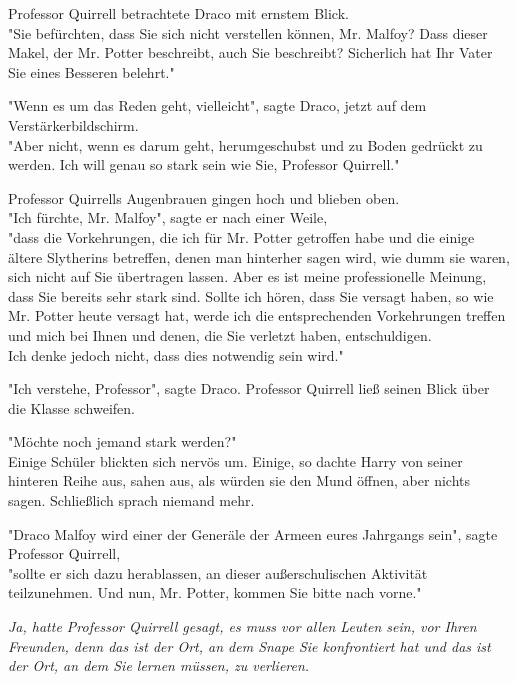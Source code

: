 {Professor Quirrell betrachtete Draco mit ernstem Blick.\\ "Sie befürchten, dass Sie sich nicht verstellen können, Mr. Malfoy? Dass dieser Makel, der Mr. Potter beschreibt, auch Sie beschreibt? Sicherlich hat Ihr Vater Sie eines Besseren belehrt."

"Wenn es um das Reden geht, vielleicht", sagte Draco, jetzt auf dem Verstärkerbildschirm.\\ "Aber nicht, wenn es darum geht, herumgeschubst und zu Boden gedrückt zu werden. Ich will genau so stark sein wie Sie, Professor Quirrell."

Professor Quirrells Augenbrauen gingen hoch und blieben oben.\\ "Ich fürchte, Mr. Malfoy", sagte er nach einer Weile,\\ "dass die Vorkehrungen, die ich für Mr. Potter getroffen habe und die einige ältere Slytherins betreffen, denen man hinterher sagen wird, wie dumm sie waren, sich nicht auf Sie übertragen lassen. Aber es ist meine professionelle Meinung, dass Sie bereits sehr stark sind. Sollte ich hören, dass Sie versagt haben, so wie Mr. Potter heute versagt hat, werde ich die entsprechenden Vorkehrungen treffen und mich bei Ihnen und denen, die Sie verletzt haben, entschuldigen.\\ Ich denke jedoch nicht, dass dies notwendig sein wird."

"Ich verstehe, Professor", sagte Draco. Professor Quirrell ließ seinen Blick über die Klasse schweifen.

"Möchte noch jemand stark werden?"\\ Einige Schüler blickten sich nervös um. Einige, so dachte Harry von seiner hinteren Reihe aus, sahen aus, als würden sie den Mund öffnen, aber nichts sagen. Schließlich sprach niemand mehr.

"Draco Malfoy wird einer der Generäle der Armeen eures Jahrgangs sein", sagte Professor Quirrell,\\ "sollte er sich dazu herablassen, an dieser außerschulischen Aktivität teilzunehmen. Und nun, Mr. Potter, kommen Sie bitte nach vorne."

\emph{Ja, hatte Professor Quirrell gesagt, es muss vor allen Leuten sein, vor Ihren Freunden, denn das ist der Ort, an dem Snape Sie konfrontiert hat und das ist der Ort, an dem Sie lernen müssen, zu verlieren.}

}
